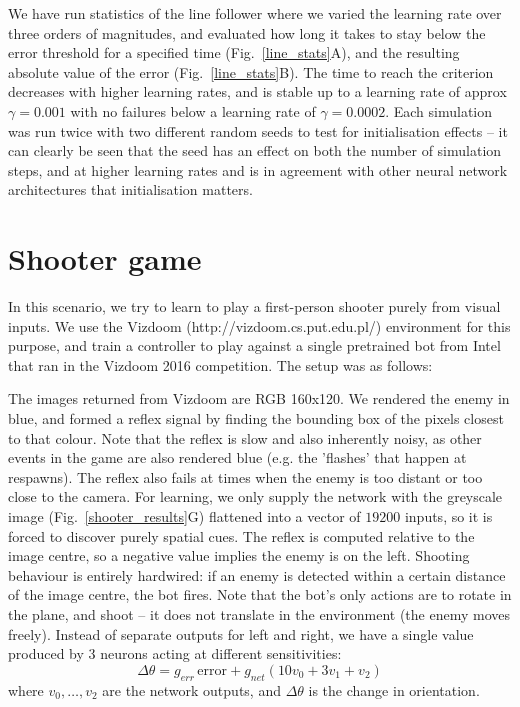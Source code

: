 \documentclass{aamas2018}
\begin{document}
We have run statistics of the line follower where we varied the
learning rate over three orders of magnitudes, and evaluated how long
it takes to stay below the error threshold for a specified time
(Fig.~\ref{line_stats}A), and the resulting absolute value of the
error (Fig.~\ref{line_stats}B). The time to reach the criterion
decreases with higher learning rates, and is stable up to a learning
rate of approx $\gamma = 0.001$ with no failures below a learning rate of
$\gamma = 0.0002$. Each simulation was run twice with two different random seeds to
test for initialisation effects -- it can clearly be seen that
the seed has an effect on both the number of simulation steps,
and at higher learning rates and is in agreement with other neural
network architectures that initialisation matters.




\section{Shooter game}
In this scenario, we try to learn to play a first-person shooter
purely from visual inputs. We use the Vizdoom
(http://vizdoom.cs.put.edu.pl/) environment for this purpose, and
train a controller to play against a single pretrained bot from Intel
that ran in the Vizdoom 2016 competition. The setup was as follows:

The images returned from Vizdoom are RGB 160x120. We rendered the
enemy in blue, and formed a reflex signal by finding the bounding box
of the pixels closest to that colour. Note that the reflex is slow and
also inherently noisy, as other events in the game are also rendered
blue (e.g. the 'flashes' that happen at respawns). The reflex also
fails at times when the enemy is too distant or too close to the
camera. For learning, we only supply the network with the greyscale
image (Fig.~\ref{shooter_results}G) flattened into a vector of $19200$
inputs, so it is forced to discover purely spatial cues. The reflex is
computed relative to the image centre, so a negative value implies the
enemy is on the left. Shooting behaviour is entirely hardwired: if an
enemy is detected within a certain distance of the image centre, the bot
fires. Note that the bot's only actions are to rotate in the plane,
and shoot -- it does not translate in the environment (the enemy moves freely). Instead of
separate outputs for left and right, we have a single value produced
by 3 neurons acting at different sensitivities:
\begin{equation}
\Delta \theta = g_{err}\, \mathrm{error} + g_{net} \left( 10 v_0 + 3 v_1 + v_2 \right)
\end{equation}
where $v_0, \ldots, v_2$ are the network outputs, and $\Delta \theta$
is the change in orientation.
\end{document}
